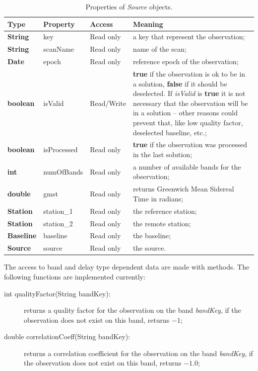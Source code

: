 \documentclass [10pt,letterpaper]{report}
\begin{document}
{{\begin{table}[htb]
\centering
\footnotesize
\begin{tabular}{lllp{}}
\hline
Type & Property & Access & Meaning\\
\hline
  {\bf String}  & key           & Read only & a key that represent the observation;\\
  {\bf String}  & scanName      & Read only & name of the scan;\\
  {\bf Date}    & epoch         & Read only & reference epoch of the observation;\\
  {\bf boolean} & isValid       & Read/Write& {\bf true} if the observation is ok to be
    in a solution, {\bf false} if it should be deselected. If {\sl isValid} is {\bf true}
    it is not necessary that the observation will be in a solution -- other reasons
    could prevent that, like low quality factor, deselected baseline, etc.;\\
  {\bf boolean} & isProcessed   & Read only & {\bf true} if the observation was
    processed in the last solution;\\
  {\bf int}     & numOfBands    & Read only & a number of available bands for the
    observation;\\
  {\bf double}  & gmst          & Read only & returns Greenwich Mean Sidereal Time
    in radians;\\
  {\bf Station} & station\_1    & Read only & the reference station;\\
  {\bf Station} & station\_2    & Read only & the remote station;\\
  {\bf Baseline}& baseline      & Read only & the baseline;\\
  {\bf Source}  & source        & Read only & the source.\\
\hline
\end{tabular}
\caption{Properties of {\sl Source} objects.}
\label{tab-scr-session-obs}
\end{table}
\noindent

The access to band and delay type dependent data are made with methods. The following
functions are implemented currently:

\begin{description}
\item[int qualityFactor(String bandKey):] returns a quality factor for the
    observation on the band {\sl bandKey}, if the observation does not exist on this
    band, returns $-1$;

\item[double correlationCoeff(String bandKey):] returns a correlation coefficient
    for the observation on the band {\sl bandKey}, if the observation does not exist on
    this band, returns $-1.0$;


\end{description}}}
\end{document}
